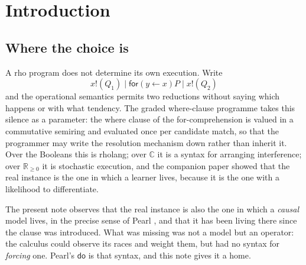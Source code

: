 \documentclass[11pt,a4paper]{article}
\theoremstyle{plain}
\theoremstyle{definition}
\theoremstyle{remark}
\newcommand{\rhoc}{\textsf{rho}}
\newcommand{\Rnn}{\mathbb{R}_{\geq 0}}
\newcommand{\Cx}{\mathbb{C}}
\newcommand{\dok}{\textsf{do}}
\newcommand{\fork}{\textsf{for}}
\newcommand{\where}{\textsf{where}}
\begin{document}
\begin{abstract}
The naive interpretation of the construct is expensive in three independent
ways --- the constraint language can contain modalities and fixed points, the
scope can be dynamic through reflection, and restriction changes the
normalisation of contention sets whose enumeration is permanent-shaped --- and
whether a given $\dok$ is vacuous is a reachability question. We propose
fragments of the constraint language graded by evaluation cost, and type-based
restrictions on the scope (staging, flatness, finite-domain channel types,
namespace confinement) under which lowering is exact, checks are constant-time,
and the semantics is Pearl's. We close by proposing the mechanism as the
constructive content owed by the companion note on inhabiting choice: rung two
of Pearl's ladder is a graded race under a $\dok$, rung three is its replay, and
the vending-machine refusal that no trace can reveal is a receipt that starves
under a one-line intervention.
\end{abstract}

\tableofcontents

\section{Introduction}\label{sec:intro}

\subsection{Where the choice is}

A \rhoc{} program does not determine its own execution. Write
\[
  x!(Q_1) \mid \fork(y \leftarrow x)P \mid x!(Q_2)
\]
and the operational semantics permits two reductions without saying which
happens or with what tendency. The graded where-clause programme
\cite{GradedV4,GradedQuantum,GradedPLN} takes this silence as a parameter: the
\where{} clause of the for-comprehension is valued in a commutative semiring and
evaluated once per candidate match, so that the programmer may write the
resolution mechanism down rather than inherit it. Over the Booleans this is
rholang; over $\Cx$ it is a syntax for arranging interference; over $\Rnn$ it is
stochastic execution, and the companion paper \cite{GradedPLN} showed that the
real instance is the one in which a learner lives, because it is the one with a
likelihood to differentiate.

The present note observes that the real instance is also the one in which a
\emph{causal} model lives, in the precise sense of Pearl
\cite{Pearl95,Pearl09}, and that it has been living there since the clause was
introduced. What was missing was not a model but an operator: the calculus
could observe its races and weight them, but had no syntax for \emph{forcing}
one. Pearl's $\dok$ is that syntax, and this note gives it a home.
\end{document}
